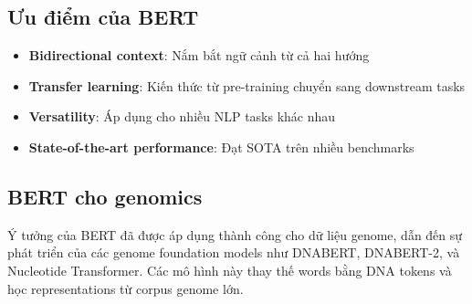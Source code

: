 \subsection{Ưu điểm của BERT}

\begin{itemize}
    \item \textbf{Bidirectional context}: Nắm bắt ngữ cảnh từ cả hai hướng
    \item \textbf{Transfer learning}: Kiến thức từ pre-training chuyển sang downstream tasks
    \item \textbf{Versatility}: Áp dụng cho nhiều NLP tasks khác nhau
    \item \textbf{State-of-the-art performance}: Đạt SOTA trên nhiều benchmarks
\end{itemize}

\subsection{BERT cho genomics}

Ý tưởng của BERT đã được áp dụng thành công cho dữ liệu genome, dẫn đến sự phát triển của các genome foundation models như DNABERT, DNABERT-2, và Nucleotide Transformer. Các mô hình này thay thế words bằng DNA tokens và học representations từ corpus genome lớn.
